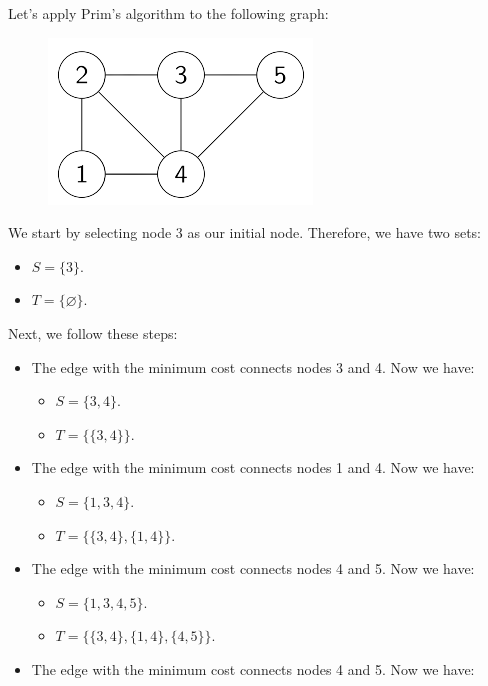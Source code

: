 \documentclass[12pt, a4paper]{report}
\begin{document}
    \begin{example}
        Let's apply Prim's algorithm to the following graph:
        \begin{figure}[H]
            \centering
            \includegraphics[width=0.3\linewidth]{images/sgraph.png}
        \end{figure}
        We start by selecting node 3 as our initial node. 
        Therefore, we have two sets: 
        \begin{itemize}
            \item $S=\{3\}$.
            \item $T=\{\varnothing\}$.
        \end{itemize}
        Next, we follow these steps:
        \begin{itemize}
            \item The edge with the minimum cost connects nodes 3 and 4. 
                Now we have: 
                \begin{itemize}
                    \item $S=\{3,4\}$.
                    \item $T=\{\{3,4\}\}$.
                \end{itemize}
            \item The edge with the minimum cost connects nodes 1 and 4. 
                Now we have:
                \begin{itemize}
                    \item $S=\{1,3,4\}$. 
                    \item $T=\{\{3,4\},\{1,4\}\}$.
                \end{itemize}
            \item The edge with the minimum cost connects nodes 4 and 5. 
            Now we have: 
            \begin{itemize}
                \item $S=\{1,3,4,5\}$.
                \item $T=\{\{3,4\},\{1,4\},\{4,5\}\}$.
            \end{itemize}
            \item The edge with the minimum cost connects nodes 4 and 5. 
            Now we have:

\end{itemize}
\end{example}
\end{document}
